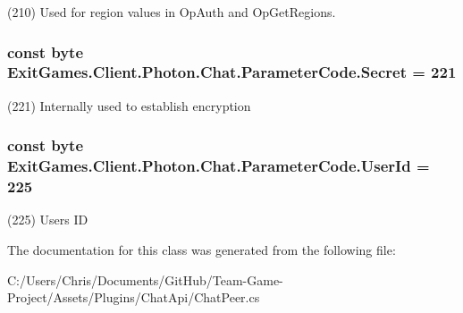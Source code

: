 (210) Used for region values in Op\+Auth and Op\+Get\+Regions.

\subsubsection[{\texorpdfstring{Secret}{Secret}}]{\setlength{\rightskip}{0pt plus 5cm}const byte Exit\+Games.\+Client.\+Photon.\+Chat.\+Parameter\+Code.\+Secret = 221}\hypertarget{class_exit_games_1_1_client_1_1_photon_1_1_chat_1_1_parameter_code_a8024f1b6758fb3fa6bcb54581965d7c9}{}\label{class_exit_games_1_1_client_1_1_photon_1_1_chat_1_1_parameter_code_a8024f1b6758fb3fa6bcb54581965d7c9}


(221) Internally used to establish encryption

\subsubsection[{\texorpdfstring{User\+Id}{UserId}}]{\setlength{\rightskip}{0pt plus 5cm}const byte Exit\+Games.\+Client.\+Photon.\+Chat.\+Parameter\+Code.\+User\+Id = 225}\hypertarget{class_exit_games_1_1_client_1_1_photon_1_1_chat_1_1_parameter_code_a2b1f96b419566ad8b1bfc78caf261f76}{}\label{class_exit_games_1_1_client_1_1_photon_1_1_chat_1_1_parameter_code_a2b1f96b419566ad8b1bfc78caf261f76}


(225) User\textquotesingle{}s ID



The documentation for this class was generated from the following file\+:\begin{DoxyCompactItemize}
\item 
C\+:/\+Users/\+Chris/\+Documents/\+Git\+Hub/\+Team-\/\+Game-\/\+Project/\+Assets/\+Plugins/\+Chat\+Api/Chat\+Peer.\+cs\end{DoxyCompactItemize}

